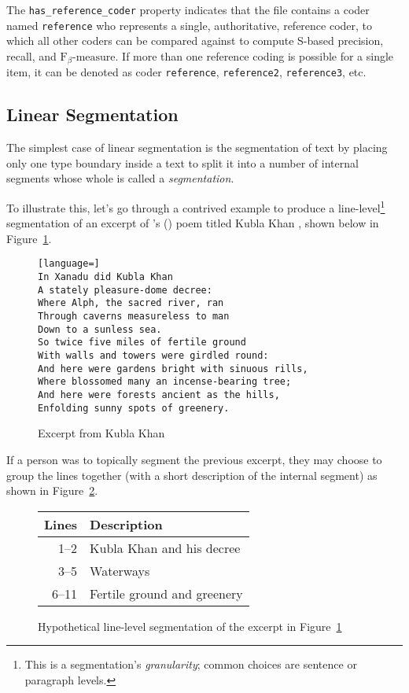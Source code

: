 \documentclass{article}
\def\citeapos#1{\citeauthor{#1}'s (\citeyear{#1})}
\begin{document}
The \verb+has_reference_coder+ property indicates that the file contains a coder
named \verb+reference+ who represents a single, authoritative, reference coder,
to which all other coders can be compared against to compute S-based precision,
recall, and $\text{F}_{\beta}\text{-measure}$.  If more than one reference 
coding is possible for a single item, it can be denoted as coder
\verb+reference+, \verb+reference2+, \verb+reference3+, etc.


\subsection{Linear Segmentation}
The simplest case of linear segmentation is the segmentation of text by placing
only one type boundary inside a text to split it into a number of internal
segments whose whole is called a \emph{segmentation}.

To illustrate this, let's go through a contrived example to produce a
line-level\footnote{This is a segmentation's \emph{granularity}; common choices
are sentence or paragraph levels.} segmentation of an excerpt of
\citeapos{Coleridge1816} poem titled Kubla Khan \citep[pp.
55--58]{Coleridge1816}, shown below in Figure~\ref{fig:linear:text:kublakhan}.

\begin{figure}[h]
\begin{lstlisting}[language=]
In Xanadu did Kubla Khan
A stately pleasure-dome decree:
Where Alph, the sacred river, ran
Through caverns measureless to man
Down to a sunless sea.
So twice five miles of fertile ground
With walls and towers were girdled round:
And here were gardens bright with sinuous rills,
Where blossomed many an incense-bearing tree;
And here were forests ancient as the hills,
Enfolding sunny spots of greenery.
\end{lstlisting}
\vspace{-3em}
\caption{Excerpt from Kubla Khan \citep[pp. 55--58]{Coleridge1816}}
\label{fig:linear:text:kublakhan}
\end{figure}

If a person was to topically segment the previous excerpt, they may choose
to group the lines together (with a short description of the internal segment)
as shown in Figure~\ref{fig:linear:segmentation:kublakhan}.

\begin{figure}[h]
\centering
\begin{tabular}{ r l }
\textbf{Lines}  & \textbf{Description} \\ \hline \hline
1--2  & Kubla Khan and his decree \\
3--5  & Waterways \\
6--11 & Fertile ground and greenery \\
\end{tabular}
\caption{Hypothetical line-level segmentation of the excerpt in Figure~\ref{fig:linear:text:kublakhan}}
\label{fig:linear:segmentation:kublakhan}
\end{figure}
\end{document}
